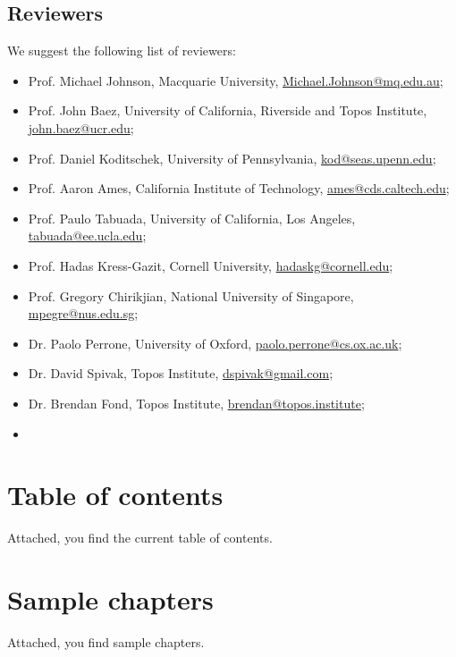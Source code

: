 \documentclass[10pt, article, one side]{memoir}
\begin{document}
    \section{Reviewers}
    We suggest the following list of reviewers:
    \begin{itemize}
        \item Prof.
              Michael Johnson, Macquarie University, \href{mailto:Michael.Johnson@mq.edu.au}{Michael.Johnson@mq.edu.au};
        \item Prof.
              John Baez, University of California, Riverside and Topos Institute, \href{mailto:john.baez@ucr.edu}{john.baez@ucr.edu};
        \item Prof.
              Daniel Koditschek, University of Pennsylvania, \href{mailto:kod@seas.upenn.edu}{kod@seas.upenn.edu};
        \item Prof.
              Aaron Ames, California Institute of Technology, \href{mailto:ames@cds.caltech.edu}{ames@cds.caltech.edu};
        \item Prof.
              Paulo Tabuada, University of California, Los Angeles, \href{mailto:tabuada@ee.ucla.edu}{tabuada@ee.ucla.edu};
        \item Prof.
              Hadas Kress-Gazit, Cornell University, \href{mailto:hadaskg@cornell.edu}{hadaskg@cornell.edu};
        \item Prof.
              Gregory Chirikjian, National University of Singapore, \href{mailto:mpegre@nus.edu.sg}{mpegre@nus.edu.sg};
        \item Dr.
              Paolo Perrone, University of Oxford, \href{mailto:paolo.perrone@cs.ox.ac.uk}{paolo.perrone@cs.ox.ac.uk};
        \item Dr.
              David Spivak, Topos Institute, \href{mailto:dspivak@gmail.com}{dspivak@gmail.com};
        \item Dr.
              Brendan Fond, Topos Institute, \href{mailto:brendan@topos.institute}{brendan@topos.institute};
        \item {}
    \end{itemize}

    \chapter{Table of contents}
    Attached, you find the current table of contents.

    \chapter{Sample chapters}
    Attached, you find sample chapters.
\end{document}
